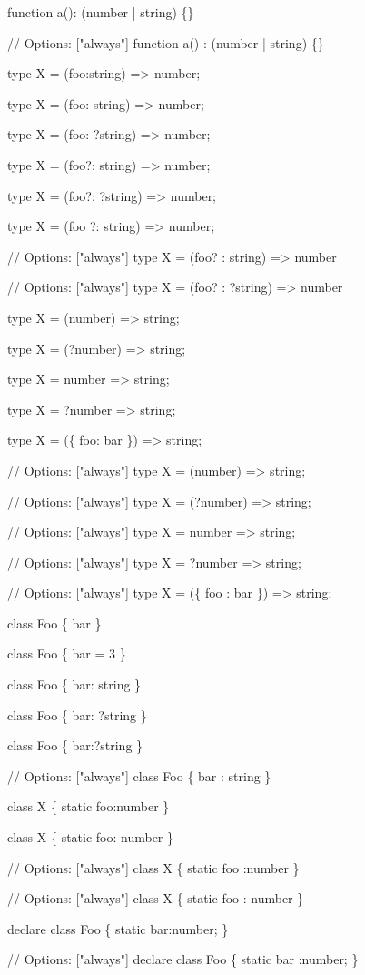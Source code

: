 \begin{DoxyCode}
function a(): (number | string) \{\}

// Options: ["always"]
function a() : (number | string) \{\}

type X = (foo:string) => number;

type X = (foo: string) => number;

type X = (foo: ?string) => number;

type X = (foo?: string) => number;

type X = (foo?: ?string) => number;

type X = (foo   ?: string) => number;

// Options: ["always"]
type X = (foo? : string) => number

// Options: ["always"]
type X = (foo? : ?string) => number

type X = (number) => string;

type X = (?number) => string;

type X = number => string;

type X = ?number => string;

type X = (\{ foo: bar \}) => string;

// Options: ["always"]
type X = (number) => string;

// Options: ["always"]
type X = (?number) => string;

// Options: ["always"]
type X = number => string;

// Options: ["always"]
type X = ?number => string;

// Options: ["always"]
type X = (\{ foo : bar \}) => string;

class Foo \{ bar \}

class Foo \{ bar = 3 \}

class Foo \{ bar: string \}

class Foo \{ bar: ?string \}

class Foo \{ bar:?string \}

// Options: ["always"]
class Foo \{ bar : string \}

class X \{ static foo:number \}

class X \{ static foo: number \}

// Options: ["always"]
class X \{ static foo :number \}

// Options: ["always"]
class X \{ static foo : number \}

declare class Foo \{ static bar:number; \}

// Options: ["always"]
declare class Foo \{ static bar :number; \}


\end{DoxyCode}
